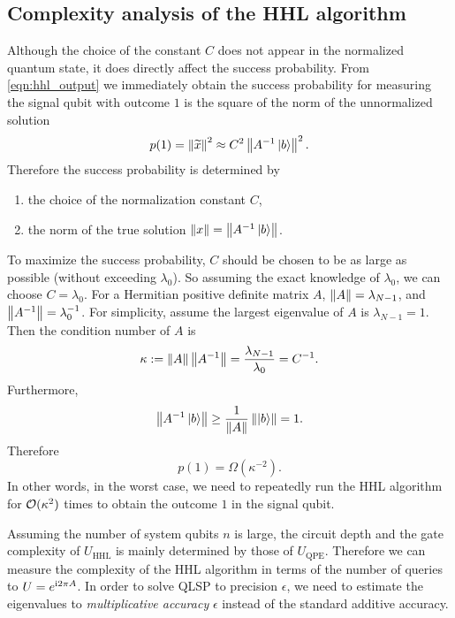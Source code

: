 \subsection{Complexity analysis of the HHL algorithm}\label{sec:analysis_hhl}

Although the choice of the constant $C$ does not appear in the normalized quantum state, it does directly affect the success probability. 
From \cref{eqn:hhl_output} we immediately obtain the success probability for measuring the signal qubit with outcome $1$ is the square of the norm of the unnormalized solution
\begin{equation}
p(1)=\left\lVert\widetilde{x}\right\rVert^2\approx C^2 \left\lVert A^{-1}\ket{b}\right\rVert^2.
\end{equation}
Therefore the success probability is determined by 
\begin{enumerate}

\item the choice of the normalization constant $C$,

\item the norm of the true solution $\left\lVert x\right\rVert=\left\lVert A^{-1}\ket{b}\right\rVert$.

\end{enumerate}

To maximize the success probability, $C$ should be chosen to be as large as possible (without exceeding $\lambda_0$).
So assuming the exact knowledge of $\lambda_0$, we can choose $C=\lambda_0$.
For a Hermitian positive definite matrix $A$, $\left\lVert A\right\rVert=\lambda_{N-1}$, and $\left\lVert A^{-1}\right\rVert=\lambda_0^{-1}$.
For simplicity, assume the largest eigenvalue of $A$ is $\lambda_{N-1}=1$.
Then the condition number of $A$ is
\begin{equation}
\kappa:=\left\lVert A\right\rVert\left\lVert A^{-1}\right\rVert=\frac{\lambda_{N-1}}{\lambda_0}=C^{-1}.
\end{equation}
Furthermore, 
\begin{equation}
\left\lVert A^{-1}\ket{b}\right\rVert\ge \frac{1}{\left\lVert A\right\rVert}\left\lVert\ket{b}\right\rVert= 1.
\end{equation}
Therefore 
\begin{equation}
p(1)=\Omega(\kappa^{-2}).
\end{equation}
In other words, in the worst case, we need to repeatedly run the HHL algorithm for $\mathcal{O}(\kappa^2)$ times to obtain the outcome $1$ in the signal qubit.

Assuming the number of system qubits $n$ is large, the circuit depth and the gate complexity of $U_{\mathrm{HHL}}$ is mainly determined by those of $U_{\mathrm{QPE}}$. 
Therefore we can measure the complexity of the HHL algorithm in terms of the number of queries to $U=e^{\mathrm{i} 2\pi A}$.
In order to solve QLSP to precision $\epsilon$, we need to estimate the eigenvalues to \emph{multiplicative accuracy} $\epsilon$ instead of the standard additive accuracy.

